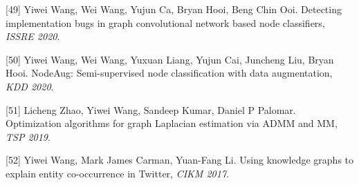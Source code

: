 [49] Yiwei Wang, Wei Wang, Yujun Ca, Bryan Hooi, Beng Chin Ooi. Detecting implementation bugs in graph convolutional network based node classifiers, \textit{ISSRE 2020}.

[50] Yiwei Wang, Wei Wang, Yuxuan Liang, Yujun Cai, Juncheng Liu, Bryan Hooi. NodeAug: Semi-supervised node classification with data augmentation, \textit{KDD 2020}.

[51] Licheng Zhao, Yiwei Wang, Sandeep Kumar, Daniel P Palomar. Optimization algorithms for graph Laplacian estimation via ADMM and MM, \textit{TSP 2019}.

[52] Yiwei Wang, Mark James Carman, Yuan-Fang Li. Using knowledge graphs to explain entity co-occurrence in Twitter, \textit{CIKM 2017}.